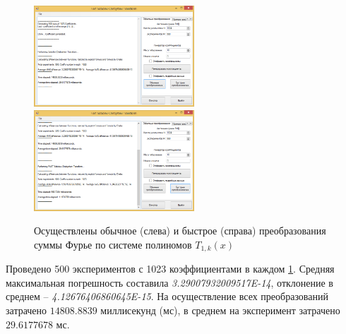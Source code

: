 \begin{figure}[H]
	\begin{center}
		\includegraphics[width=170pt]{pictures/sms-stn-1(4)}
		\quad
		\includegraphics[width=170pt]{pictures/sms-stn-1(5)}
		\caption{
			Осуществлены обычное (слева) и быстрое (справа) преобразования суммы Фурье по системе полиномов $T_{1,k}(x)$
		}\label{sms-stn-1-img3}
	\end{center}
\end{figure}

Проведено 500 экспериментов с 1023 коэффициентами в каждом \ref{sms-stn-1-img3}.
Средняя максимальная погрешность составила \textit{3.29007932009517E-14}, отклонение в среднем -- \linebreak \textit{4.12676406860645E-15}.
На осуществление всех преобразований затрачено $14808.8839$ \linebreak миллисекунд (мс), в среднем на эксперимент затрачено $29.6177678$ мс.

